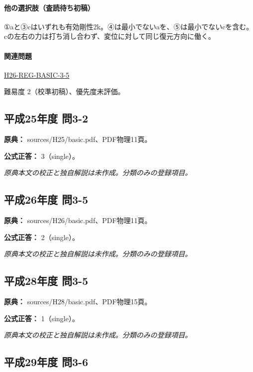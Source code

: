 \paragraph{他の選択肢（査読待ち初稿）} ①aと③cはいずれも有効剛性2k。④は最小でないaを、⑤は最小でないcを含む。cの左右の力は打ち消し合わず、変位に対して同じ復元方向に働く。

\paragraph{関連問題} \hyperref[q:h26-reg-basic-3-5]{H26-REG-BASIC-3-5}

\par 難易度 2（校準初稿）、優先度未評価。

\subsection{平成25年度 問3-2}
\label{q:h25-reg-basic-3-2}

\noindent\textbf{原典：} sources/H25/basic.pdf、PDF物理11頁。

\textbf{公式正答：} 3（single）。

\par\textit{原典本文の校正と独自解説は未作成。分類のみの登録項目。}

\subsection{平成26年度 問3-5}
\label{q:h26-reg-basic-3-5}

\noindent\textbf{原典：} sources/H26/basic.pdf、PDF物理11頁。

\textbf{公式正答：} 2（single）。

\par\textit{原典本文の校正と独自解説は未作成。分類のみの登録項目。}

\subsection{平成28年度 問3-5}
\label{q:h28-reg-basic-3-5}

\noindent\textbf{原典：} sources/H28/basic.pdf、PDF物理15頁。

\textbf{公式正答：} 1（single）。

\par\textit{原典本文の校正と独自解説は未作成。分類のみの登録項目。}

\subsection{平成29年度 問3-6}
\label{q:h29-reg-basic-3-6}

